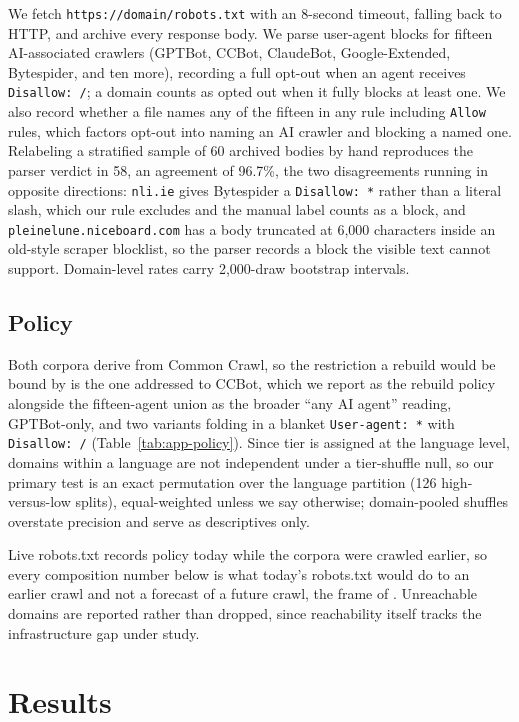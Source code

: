 \documentclass[11pt]{article}
\begin{document}
We fetch \texttt{https://domain/robots.txt} with an 8-second timeout, falling back to HTTP, and archive every response body. We parse user-agent blocks for fifteen AI-associated crawlers (GPTBot, CCBot, ClaudeBot, Google-Extended, Bytespider, and ten more), recording a full opt-out when an agent receives \texttt{Disallow:~/}; a domain counts as opted out when it fully blocks at least one. We also record whether a file names any of the fifteen in any rule including \texttt{Allow} rules, which factors opt-out into naming an AI crawler and blocking a named one. Relabeling a stratified sample of 60 archived bodies by hand reproduces the parser verdict in 58, an agreement of 96.7\%, the two disagreements running in opposite directions: \texttt{nli.ie} gives Bytespider a \texttt{Disallow:~*} rather than a literal slash, which our rule excludes and the manual label counts as a block, and \texttt{pleinelune.niceboard.com} has a body truncated at 6,000 characters inside an old-style scraper blocklist, so the parser records a block the visible text cannot support. Domain-level rates carry 2,000-draw bootstrap intervals.

\subsection{Policy}

Both corpora derive from Common Crawl, so the restriction a rebuild would be bound by is the one addressed to CCBot, which we report as the rebuild policy alongside the fifteen-agent union as the broader ``any AI agent'' reading, GPTBot-only, and two variants folding in a blanket \texttt{User-agent:~*} with \texttt{Disallow:~/} (Table~\ref{tab:app-policy}). Since tier is assigned at the language level, domains within a language are not independent under a tier-shuffle null, so our primary test is an exact permutation over the language partition (126 high-versus-low splits), equal-weighted unless we say otherwise; domain-pooled shuffles overstate precision and serve as descriptives only.

Live robots.txt records policy today while the corpora were crawled earlier, so every composition number below is what today's robots.txt would do to an earlier crawl and not a forecast of a future crawl, the frame of \citet{longpre2024consent}. Unreachable domains are reported rather than dropped, since reachability itself tracks the infrastructure gap under study.

\section{Results}
\label{sec:results}
\end{document}
